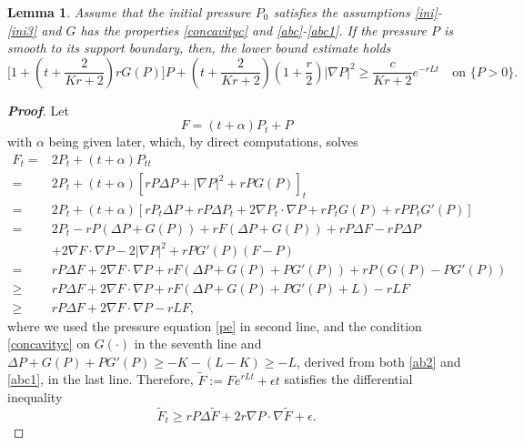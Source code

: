 \documentclass[10pt]{article}         %
\newtheorem{lemma}{Lemma}[section]
\numberwithin{equation}{section}
\begin{document}
\begin{lemma}\label{alphat}
Assume that the initial pressure $P_0$ satisfies the assumptions \eqref{ini}-\eqref{ini3}
and $G$ has the properties \eqref{concavityc} and \eqref{abc}-\eqref{abc1}. If the pressure $P$ is smooth to its support boundary, then, the lower bound estimate holds
\[\big[1+(t+\frac{2}{Kr+2})rG(P)\big]P+(t+\frac{2}{Kr+2})(1+\frac{r}{2})|\nabla P|^2\geq \frac{c}{Kr+2}e^{-rLt}\quad \text{on }\{P>0\}.\]
\end{lemma}
\begin{proof}[\bf Proof]
Let \[F=(t+\alpha)P_t+P\] 
with $\alpha$ being given later, which, by direct computations, solves
\begin{equation*}
    \begin{aligned}
 F_t=&2P_t+(t+\alpha)P_{tt}\\
 =&2P_t+(t+\alpha)[rP\Delta P+|\nabla P|^2+rPG(P)]_t\\
 =&2P_t+(t+\alpha)[rP_t\Delta P+rP\Delta P_t+2\nabla P_t\cdot\nabla P+rP_tG(P)+rP P_tG'(P)]\\
 =&2P_t-rP(\Delta P+G(P))+rF(\Delta P+G(P))+rP\Delta F-rP\Delta P\\
 &+2\nabla F\cdot\nabla P-2|\nabla P|^2+rPG'(P)(F-P)\\
 =&rP\Delta F+2\nabla F\cdot\nabla P+rF(\Delta P+G(P)+PG'(P))+rP(G(P)-PG'(P))\\
 \geq&rP\Delta F+2\nabla F\cdot\nabla P+rF(\Delta P+G(P)+PG'(P)+L)-rLF\\
  \geq&rP\Delta F+2\nabla F\cdot\nabla P-rLF,
\end{aligned}
\end{equation*}
where we used the pressure equation \eqref{pe} in second line, and the condition \eqref{concavityc} on $G(\cdot)$ in the seventh line and $\Delta P+G(P)+PG'(P)\geq -K-(L-K)\geq -L$, derived from both \eqref{ab2} and \eqref{abc1}, in the last line. Therefore, $\tilde{F}:=Fe^{rLt}+\epsilon t$ satisfies the differential inequality 
\begin{equation}\label{piee}
  \tilde{F}_t\geq rP\Delta \tilde{F}+2r\nabla P\cdot\nabla \tilde{F}+\epsilon.  
\end{equation}



\end{proof}
\end{document}
